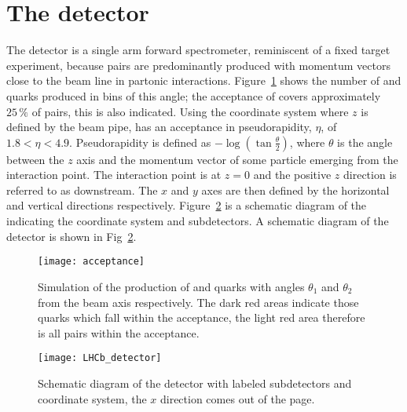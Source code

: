 \section{The \lhcb detector}
The \lhcb detector is a single arm forward spectrometer, reminiscent of a fixed target experiment,
because \bbbar pairs are predominantly produced with momentum vectors close to the beam line in
partonic interactions.
Figure~\ref{fig:lhcb:bbbar} shows the number of \bquark and \bquarkbar quarks produced in bins of
this angle; the acceptance of \lhcb covers approximately $25\,\%$ of \bbbar pairs, this is also indicated.
Using the coordinate system where $z$ is defined by the \lhc beam pipe,
\lhcb has an acceptance in pseudorapidity, $\eta$, of $1.8<\eta<4.9$.  %
Pseudorapidity is defined as $-\log\left(\tan\tfrac\theta2\right)$, where $\theta$ is the angle
between the $z$ axis and the momentum vector of some particle emerging from the interaction point.
The interaction point is at $z=0$ and the positive $z$ direction is referred to as downstream.
The $x$ and $y$ axes are then defined by the horizontal and vertical directions respectively.
Figure~\ref{fig:lhcb:lhcb} is a schematic diagram of the \lhcb indicating the coordinate system and
subdetectors.
A schematic diagram of the \lhcb detector is shown in Fig~\ref{fig:lhcb:lhcb}.

\begin{figure}
  \begin{center}
    \texttt{[image: acceptance]}
  \end{center}
  \caption[Simulated production of \protect\bbbar pairs]
  {\small
    Simulation of the production of \bquark and \protect\bquarkbar quarks with angles $\theta_1$ and
    $\theta_2$ from the beam axis respectively.
    The dark red areas indicate those quarks which fall within the \lhcb acceptance, the light red
    area therefore is all \bbbar pairs within the acceptance.
  }
  \label{fig:lhcb:bbbar}
\end{figure}

\begin{figure}
  \begin{center}
    \texttt{[image: LHCb\_detector]}
  \end{center}
  \caption[\lhcb detector]
  {\small
    Schematic diagram of the \lhcb detector with labeled subdetectors and coordinate system, the
    $x$ direction comes out of the page.
  }
  \label{fig:lhcb:lhcb}
\end{figure}


